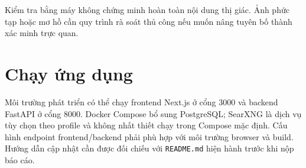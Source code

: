 Kiểm tra bằng máy không chứng minh hoàn toàn nội dung thị giác. Ảnh phức tạp hoặc mơ hồ cần quy trình rà soát thủ công nếu muốn nâng tuyên bố thành xác minh trực quan.

\section{Chạy ứng dụng}

Môi trường phát triển có thể chạy frontend Next.js ở cổng 3000 và backend FastAPI ở cổng 8000. Docker Compose bổ sung PostgreSQL; SearXNG là dịch vụ tùy chọn theo profile và không nhất thiết chạy trong Compose mặc định. Cấu hình endpoint frontend/backend phải phù hợp với môi trường browser và build. Hướng dẫn cập nhật cần được đối chiếu với \texttt{README.md} hiện hành trước khi nộp báo cáo.
